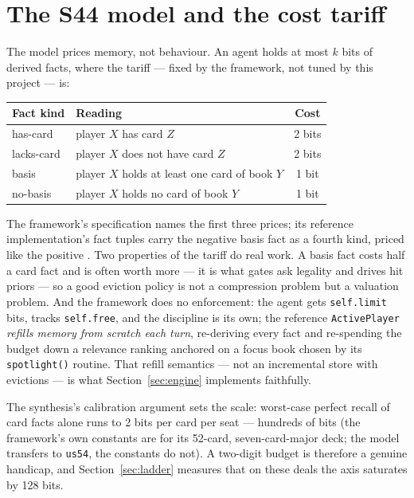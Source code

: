 \documentclass[11pt]{article}
\newcommand{\code}[1]{\texttt{#1}}
\newcommand{\usff}{\code{us54}}
\begin{document}
\section{The S44 model and the cost tariff}
\label{sec:model}

The model prices memory, not behaviour. An agent holds at most $k$ bits of derived
facts, where the tariff --- fixed by the framework, not tuned by this project
\cite{kannan,playstyles} --- is:

\begin{center}
\begin{tabular}{@{}llc@{}}
\toprule
Fact kind & Reading & Cost \\
\midrule
has-card   & player $X$ has card $Z$ & 2 bits \\
lacks-card & player $X$ does not have card $Z$ & 2 bits \\
basis      & player $X$ holds at least one card of book $Y$ & 1 bit \\
no-basis   & player $X$ holds no card of book $Y$ & 1 bit \\
\bottomrule
\end{tabular}
\end{center}

\noindent
The framework's specification names the first three prices; its reference
implementation's fact tuples carry the negative basis fact as a fourth kind, priced like
the positive \cite{kannan,playstyles}. Two properties of the tariff do real work. A
basis fact costs half a card fact and is often worth more --- it is what gates ask
legality and drives hit priors --- so a good eviction policy is not a compression
problem but a valuation problem. And the framework does no enforcement: the agent gets
\code{self.limit} bits, tracks \code{self.free}, and the discipline is its own; the
reference \code{ActivePlayer} \emph{refills memory from scratch each turn}, re-deriving
every fact and re-spending the budget down a relevance ranking anchored on a focus book
chosen by its \code{spotlight()} routine. That refill semantics --- not an incremental
store with evictions --- is what Section~\ref{sec:engine} implements faithfully.

The synthesis's calibration argument \cite{playstyles} sets the scale: worst-case
perfect recall of card facts alone runs to 2 bits per card per seat --- hundreds of bits
(the framework's own constants are for its 52-card, seven-card-major deck; the model
transfers to \usff{}, the constants do not). A two-digit budget is therefore a genuine
handicap, and Section~\ref{sec:ladder} measures that on these deals the axis saturates
by 128 bits.
\end{document}
